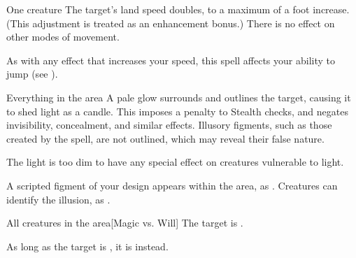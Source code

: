 \spellrng{\rngclose}
\spelldur{\durshort \dismissable}
\begin{spelltarget}{One creature}
    \spelleffect The target's land speed doubles, to a maximum of a  foot increase. (This adjustment is treated as an enhancement bonus.) There is no effect on other modes of movement.
\end{spelltarget}
\spellnotes As with any effect that increases your speed, this spell affects your ability to jump (see ).

\begin{comment}
\subsubsection{F}
\end{comment}

\spelldur{\durshort \dismissable}
\begin{spelltarget}{Everything in the area}
    \spelleffect A pale glow surrounds and outlines the target, causing it to shed light as a candle. This imposes a  penalty to Stealth checks, and negates invisibility, concealment, and similar effects. Illusory figments, such as those created by the  spell, are not outlined, which may reveal their false nature.
\end{spelltarget}
\spellnotes The light is too dim to have any special effect on creatures vulnerable to light.

\spelldur{\durlong \dismissable}
\spellline
\spelleffect A scripted figment of your design appears within the area, as .
\spellnotes Creatures can identify the illusion, as .

\spelldur{\durshort \dismissable}
\begin{spelltarget}{All creatures in the area}[Magic vs. Will]
    \spellsuccess The target is \shaken.

    As long as the target is \bloodied, it is \frightened instead.
\end{spelltarget}

